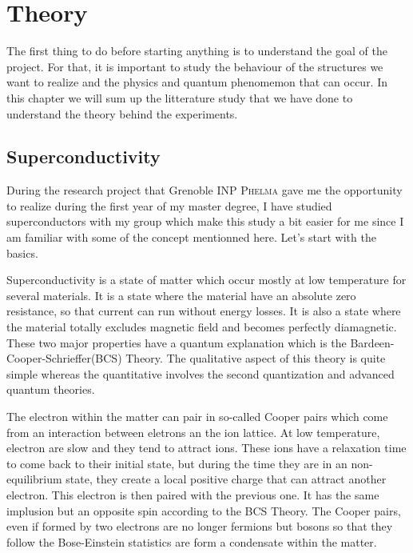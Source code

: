 \chapter{Theory}
 \label{Chap1}
 
    The first thing to do before starting anything is to understand the goal of the project. For that, it is important to study the behaviour of the structures we want to realize and the physics and quantum phenomemon that can occur. In this chapter we will sum up the litterature study that we have done to understand the theory behind the experiments.
        
        \section{Superconductivity}
            During the research project that Grenoble INP \textsc{Phelma} gave me the opportunity to realize during the first year of my master degree, I have studied superconductors with my group which make this study a bit easier for me since I am familiar with some of the concept mentionned here. Let's start with the basics. 
            
            Superconductivity is a state of matter which occur mostly at low temperature for several materials. It is a state where the material have an absolute zero resistance, so that current can run without energy losses. It is also a state where the material totally excludes magnetic field and becomes perfectly diamagnetic\cite{Tinkham}. These two major properties have a quantum explanation which is the Bardeen-Cooper-Schrieffer(BCS) Theory\cite{BCS}. The qualitative aspect of this theory is quite simple whereas the quantitative involves the second quantization and advanced quantum theories. 
            
            The electron within the matter can pair in so-called Cooper pairs which come from an interaction between eletrons an the ion lattice. At low temperature, electron are slow and they tend to attract ions. These ions have a relaxation time to come back to their initial state, but during the time they are in an non-equilibrium state, they create a local positive charge that can attract another electron. This electron is then paired with the previous one. It has the same implusion but an opposite spin according to the BCS Theory. The Cooper pairs, even if formed by two electrons are no longer fermions but bosons so that they follow the Bose-Einstein statistics are form a condensate within the matter.
            
